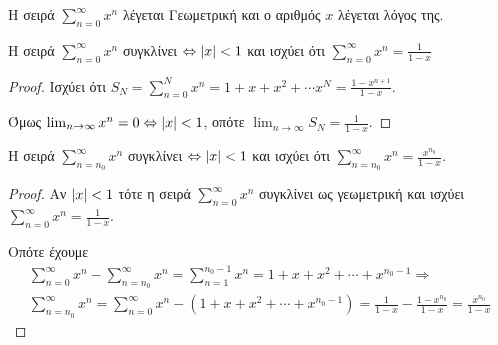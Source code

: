 Η σειρά $ \sum_{n=0}^{\infty} x^{n} $ λέγεται \textcolor{Col1}{Γεωμετρική} και ο αριθμός
$x$ λέγεται \textcolor{Col1}{λόγος} της.

\begin{mybox3}
\begin{prop}
Η σειρά $ \sum_{n=0}^{\infty} x^{n} $ συγκλίνει $ \Leftrightarrow \abs{x} < 1 $
και ισχύει ότι $ \sum_{n=0}^{\infty} x^{n} = \frac{1}{1-x} $
\end{prop}
\end{mybox3}
\begin{proof}
\item {}
    Ισχύει ότι $ S_{N} = \sum_{n=0}^{N} x^{n} =  1 + x + x^{2} + \cdots x^{N} = 
    \frac{1- x^{n+1}}{1-x} $.

    Όμως $ \lim_{n \to \infty} x^{n} = 0 \Leftrightarrow \abs{x} < 1 $, οπότε 
    $ \lim_{n \to \infty} S_{N} = \frac{1}{1-x} $.
\end{proof}

\begin{mybox3}
\begin{cor}
    Η σειρά $ \sum_{n= n_{0}}^{\infty} x^{n} $ συγκλίνει $ \Leftrightarrow \abs{x} <1 $
    και ισχύει ότι $ \sum_{n= n_{0}}^{\infty} x^{n} = \frac{x^{n_{0}}}{1-x} $.
\end{cor}
\end{mybox3}
\begin{proof}
\item {}
    Αν $ \abs{x} < 1 $ τότε η σειρά $ \sum_{n=0}^{\infty} x^{n} $ συγκλίνει ως 
    γεωμετρική και ισχύει $ \sum_{n=0}^{\infty} x^{n} = \frac{1}{1-x} $. 

    Οπότε έχουμε
    \begin{align*}
        \sum_{n=0}^{\infty} x^{n} - \sum_{n= n_{0}}^{\infty} x^{n} = 
        \sum_{n= 1}^{n_{0} -1} x^{n} = 1 + x + x^{2} + \cdots + x^{n_{0}-1} 
        \Rightarrow \\
        \sum_{n= n_{0}}^{\infty} x^{n} = \sum_{n=0}^{\infty} x^{n} - (1 + x + x^{2} + 
        \cdots + x^{n_{0}-1}) = \frac{1}{1-x} - \frac{1- x^{n_{0}}}{1-x} = 
        \frac{x^{n_{0}}}{1-x}  
    \end{align*} 
\end{proof}

